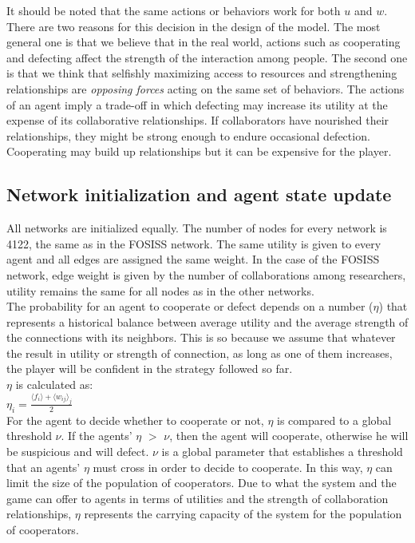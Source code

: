 \documentclass[11pt]{article}
\begin{document}
It should be noted that the same actions or behaviors work for
  both $u$ and $w$. There are two reasons for this decision in the design of the
model. The most general one is that we believe that in the real world,
actions such as cooperating and defecting affect the strength of the interaction
among people. The second one is that we think that selfishly maximizing access to resources and
strengthening relationships are \emph{opposing forces} acting on the same set of
behaviors. The actions of an agent imply a trade-off in which defecting may
increase its utility at the expense of its collaborative relationships. If
collaborators have nourished their relationships, they might be strong enough to
endure occasional defection. Cooperating may build up relationships but it can be
expensive for the player.

\subsection{Network initialization and agent state update}

All networks are initialized equally. The number of nodes for every network is 4122, the same as in the FOSISS network.
The same utility is given to every agent and all edges are assigned the same weight. In the case of the FOSISS
network, edge weight is given by the number of collaborations among researchers, utility remains the same for all nodes as in
the other networks.\\

The probability for an agent to cooperate or defect depends on a
number ($\eta$) that represents a historical balance between average utility and
the average strength of the connections with its neighbors. This is so
  because we assume that whatever the result in utility or strength of
  connection, as long as one of them increases, the player will be confident in
  the strategy followed so far.\\ 


$\eta$ is calculated as:\\ 


$\eta_i = \frac{\langle f_i \rangle + \langle w_{ij} \rangle _j}{2}$\\

 For the agent to decide whether to cooperate or not, $\eta$ is
  compared to a global threshold $\nu$. If the agents' $\eta$ $>$ $\nu$,
  then the agent will cooperate, otherwise he will be suspicious and will
  defect. $\nu$ is a global parameter that establishes a threshold that an
  agents' $\eta$ must cross in order to decide to cooperate. In this way,
  $\eta$ can limit the size of the population of cooperators. Due
  to what the system and the game can offer to agents in terms of utilities and the strength
  of collaboration relationships, $\eta$ represents the carrying capacity of the
  system for the population of cooperators.\\
\end{document}
